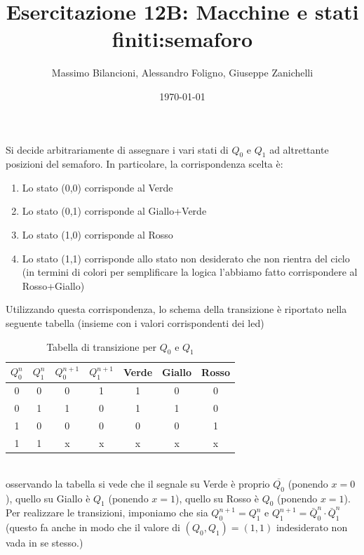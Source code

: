\documentclass[10pt,a4paper]{article}
\date{\today}
\title{Esercitazione 12B: Macchine e stati finiti:semaforo}
\author{Massimo Bilancioni, Alessandro Foligno, Giuseppe Zanichelli}
\begin{document}
	
\maketitle
Si decide arbitrariamente di assegnare i vari stati di $Q_0$ e $Q_1$ ad altrettante posizioni del semaforo. In particolare, la corrispondenza scelta è:\\
\begin{enumerate}
	\item Lo stato (0,0) corrisponde al Verde
	\item Lo stato (0,1) corrisponde al Giallo+Verde
	\item Lo stato (1,0) corrisponde al Rosso
	\item Lo stato (1,1) corrisponde allo stato non desiderato che non rientra del ciclo (in termini di colori per semplificare la  logica  l'abbiamo fatto corrispondere al Rosso+Giallo)
\end{enumerate}
Utilizzando questa corrispondenza, lo schema della transizione è riportato nella seguente tabella (insieme con i valori corrispondenti dei led)\
\begin{table}[h]\centering
\begin{tabular}{|c|c|c|c|c|c|c|}
	\hline 
	$Q_0^n$ & $Q_1^n$ & $Q_0^{n+1}$ & $Q_1^{n+1}$ & Verde & Giallo & Rosso \\ 
	\hline 
	0 & 0 & 0 & 1 & 1 & 0 & 0 \\ 
	\hline 
	0 & 1 & 1 & 0 & 1 & 1 & 0 \\ 
	\hline 
	1 & 0 & 0 & 0 & 0 & 0 & 1 \\ 
	\hline 
	1 & 1 & x & x & x & x & x \\ 
	\hline 
\end{tabular} 	
\caption{Tabella di transizione per $Q_0$ e $Q_1$}
\end{table}
\\

osservando la tabella si vede che il segnale su Verde è proprio $\overline{Q_0}$ (ponendo $x =0$), quello su Giallo è $Q_1$ (ponendo $x= 1$), quello su Rosso è $Q_0$ (ponendo $x= 1$).\\
Per realizzare le transizioni, imponiamo che sia $Q_0^{n+1}=Q_1^n$ e $Q_1^{n+1}=\bar{Q}_0^n \cdot \bar{Q}_1^n$ (questo fa anche in modo che il valore di $(Q_0,Q_1)=(1,1)$ indesiderato non vada in se stesso.)\\
\end{document}
